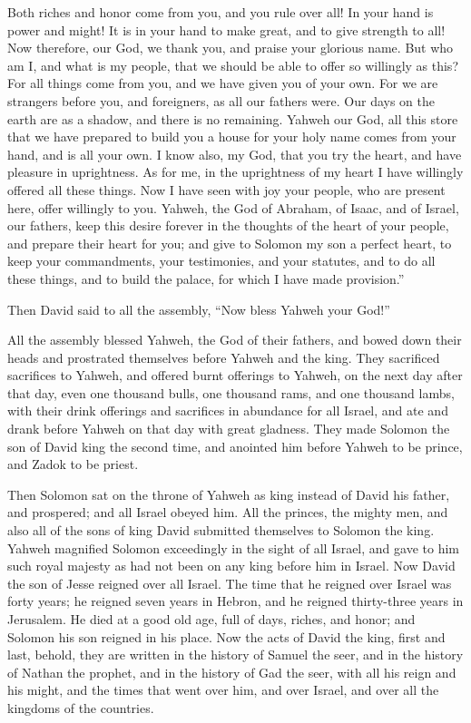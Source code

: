 {Both riches and honor come from you, and you rule over all! In your hand is power and might! It is in your hand to make great, and to give strength to all!
Now therefore, our God, we thank you, and praise your glorious name.
But who am I, and what is my people, that we should be able to offer so willingly as this? For all things come from you, and we have given you of your own.
For we are strangers before you, and foreigners, as all our fathers were. Our days on the earth are as a shadow, and there is no remaining.
Yahweh our God, all this store that we have prepared to build you a house for your holy name comes from your hand, and is all your own.
I know also, my God, that you try the heart, and have pleasure in uprightness. As for me, in the uprightness of my heart I have willingly offered all these things. Now I have seen with joy your people, who are present here, offer willingly to you.
Yahweh, the God of Abraham, of Isaac, and of Israel, our fathers, keep this desire forever in the thoughts of the heart of your people, and prepare their heart for you;
and give to Solomon my son a perfect heart, to keep your commandments, your testimonies, and your statutes, and to do all these things, and to build the palace, for which I have made provision.”
\par }{\PP {}Then David said to all the assembly, “Now bless Yahweh your God!”
\par }{\PP All the assembly blessed Yahweh, the God of their fathers, and bowed down their heads and prostrated themselves before Yahweh and the king.
They sacrificed sacrifices to Yahweh, and offered burnt offerings to Yahweh, on the next day after that day, even one thousand bulls, one thousand rams, and one thousand lambs, with their drink offerings and sacrifices in abundance for all Israel,
and ate and drank before Yahweh on that day with great gladness. They made Solomon the son of David king the second time, and anointed him before Yahweh to be prince, and Zadok to be priest.
\par }{\PP {}Then Solomon sat on the throne of Yahweh as king instead of David his father, and prospered; and all Israel obeyed him.
All the princes, the mighty men, and also all of the sons of king David submitted themselves to Solomon the king.
Yahweh magnified Solomon exceedingly in the sight of all Israel, and gave to him such royal majesty as had not been on any king before him in Israel.
Now David the son of Jesse reigned over all Israel.
The time that he reigned over Israel was forty years; he reigned seven years in Hebron, and he reigned thirty-three years in Jerusalem.
He died at a good old age, full of days, riches, and honor; and Solomon his son reigned in his place.
Now the acts of David the king, first and last, behold, they are written in the history of Samuel the seer, and in the history of Nathan the prophet, and in the history of Gad the seer,
with all his reign and his might, and the times that went over him, and over Israel, and over all the kingdoms of the countries.
\par }